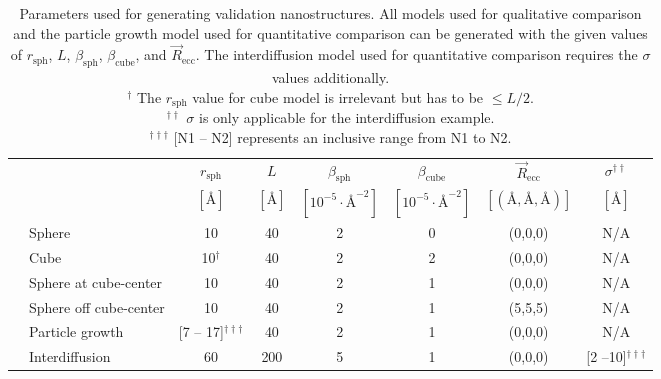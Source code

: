 \documentclass[preprint, 5p, times, twocolumn]{elsarticle}
\begin{document}
\begin{table}
\centering
\begin{tabular}{llcccccc}
\toprule
     &  & $r_{\text{sph}}$ & $L$ & $\beta_{\text{sph}}$ & $\beta_{\text{cube}}$ & $\vec{R}_{\text{ecc}}$ & $\sigma^{\dagger\dagger}$ \vspace{0.5em}\\ 
     &                        & $[\text{\AA}]$        & $[\text{\AA}]$ & $[10^{-5} \cdot \text{\AA}^{-2}]$ & $[10^{-5} \cdot \text{\AA}^{-2}]$ & $[(\text{\AA}, \text{\AA}, \text{\AA})]$ & $[\text{\AA}]$\\
\midrule
{}
& Sphere                  & 10             & 40  & 2  & 0 & (0,0,0) & N/A          \\
& Cube                    & 10$^{\dagger}$ & 40  & 2  & 2 & (0,0,0) & N/A          \\
& Sphere at cube-center   & 10             & 40  & 2  & 1 & (0,0,0) & N/A          \\
& Sphere off cube-center  & 10             & 40  & 2  & 1 & (5,5,5) & N/A          \\
\addlinespace[1mm]
\hdashline
\addlinespace[1mm]
& Particle growth         & [7 -- 17]$^{\dagger\dagger\dagger}$ & 40  & 2  & 1 & (0,0,0) & N/A         \\
& Interdiffusion          & 60                                  & 200 & 5  & 1 & (0,0,0) & [2 --10]$^{\dagger\dagger\dagger}$   \\
\bottomrule
\end{tabular}
\caption{Parameters used for generating validation nanostructures. All models used for qualitative comparison and the particle growth model used for quantitative comparison can be generated with the given values of $r_{\text{sph}}$, $L$, $\beta_{\text{sph}}$, $\beta_{\text{cube}}$, and $\vec{R}_{\text{ecc}}$. The interdiffusion model used for quantitative comparison requires the $\sigma$ values additionally.\\
\noindent $^{\dagger}$ The $r_{\text{sph}}$ value for cube model is irrelevant but has to be $\leq L/2$.\\
\noindent $^{\dagger\dagger}$ $\sigma$ is only applicable for the interdiffusion example.\\
\noindent $^{\dagger\dagger\dagger}$ [N1 -- N2] represents an inclusive range from N1 to N2.
\label{tab:param_val_struct}}
\end{table}
\end{document}
